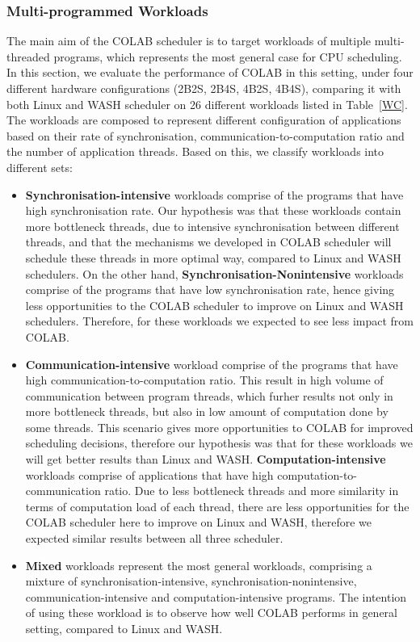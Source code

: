 \subsubsection{Multi-programmed Workloads}
The main aim of the COLAB scheduler is to target workloads of multiple multi-threaded programs, which represents the most general case for CPU scheduling. In this section, we evaluate the performance of COLAB in this setting, under four different hardware configurations (2B2S, 2B4S, 4B2S, 4B4S), comparing it with both Linux and WASH scheduler on 26 different workloads listed in Table~\ref{WC}. The workloads are composed to represent different configuration of applications based on their rate of synchronisation, communication-to-computation ratio and the number of application threads. Based on this, we classify workloads into different sets:

\begin{itemize}
\item \textbf{Synchronisation-intensive} workloads comprise of the programs that have high synchronisation rate. Our hypothesis was that these workloads contain more bottleneck threads, due to intensive synchronisation between different threads, and that the mechanisms we developed in COLAB scheduler will schedule these threads in more optimal way, compared to Linux and WASH schedulers. On the other hand, \textbf{Synchronisation-Nonintensive} workloads comprise of the programs that have low synchronisation rate, hence giving less opportunities to the COLAB scheduler to improve on Linux and WASH schedulers. Therefore, for these workloads we expected to see less impact from COLAB.
\item \textbf{Communication-intensive} workload comprise of the programs that have high communication-to-computation ratio. This result in high volume of communication between program threads, which furher results not only in more bottleneck threads, but also in low amount of computation done by some threads. This scenario gives more opportunities to COLAB for improved scheduling decisions, therefore our hypothesis was that for these workloads we will get better results than Linux and WASH. \textbf{Computation-intensive} workloads comprise of applications that have high computation-to-communication ratio. Due to less bottleneck threads and more similarity in terms of computation load of each thread, there are less opportunities for the COLAB scheduler here to improve on Linux and WASH, therefore we expected similar results between all three scheduler.
\item \textbf{Mixed} workloads represent the most general workloads, comprising a mixture of synchronisation-intensive, synchronisation-nonintensive, communication-intensive and computation-intensive programs. The intention of using these workload is to observe how well COLAB performs in general setting, compared to Linux and WASH.
\end{itemize}

